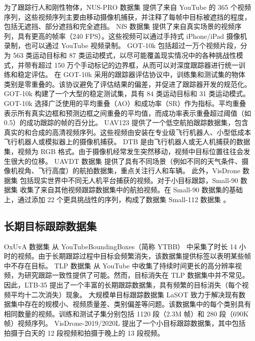 为了跟踪行人和刚性物体，NUS-PRO 数据集 \cite{NUS} 提供了来自 YouTube 的 365 个视频序列，这些视频序列主要由移动摄像机捕获，并注释了每帧中目标被遮挡的程度，包括无遮挡、部分遮挡和完全遮挡。
NfS 数据集 \cite{Nfs} 提供了来自真实场景的视频序列，具有更高的帧率（240 FPS）。这些视频可以通过手持式 iPhone/iPad 摄像机录制，也可以通过 YouTube 视频录制。
GOT-10k \cite{GOT-10k} 包括超过一万个视频片段，分为 563 类运动目标和 87 类运动模式，以尽可能覆盖现实情况中的各种挑战性模式，并带有超过 150 万个手动标记的边界框，从而可以对深度跟踪器进行统一训练和稳定评估。
在 GOT-10k 采用的跟踪器评估协议中，训练集和测试集的物体类别是零重叠的。该协议避免了评估结果的偏差，并促进了跟踪器开发的规范化。
GOT-10k 构建了一个大型的稳定测试集，具有 84 类运动目标和 31 类运动模式。GOT-10k 选择广泛使用的平均重叠（AO）和成功率（SR）作为指标。平均重叠表示所有真实边框和预测边框之间重叠的平均值，而成功率表示重叠超过阈值（如0.5）的成功跟踪的帧的百分比。
UAV123 \cite{mueller2016benchmark} 提供了一个低空航拍跟踪数据集，包含真实的和合成的高清视频序列。这些视频由安装在专业级飞行机器人、小型低成本飞行机器人或模拟器上的摄像机捕获。
DTB \cite{DTB} 是由飞行机器人或无人机捕获的数据集，视频为 RGB 格式。由于摄像机经常发生突然移动，视频中目标位置往往会发生很大的位移。
UAVDT 数据集 \cite{UAVDT} 提供了具有不同场景（例如不同的天气条件、摄像机视角、飞行高度）的航拍数据集，重点关注行人和车辆。
此外，VisDrone 数据集 \cite{VisDrone} 包括现实世界中不同无人机平台捕获的视频。对于小目标跟踪，Small-90 数据集 \cite{Small} 收集了来自其他视频跟踪数据集中的航拍视频。在 Small-90 数据集的基础上，通过添加 22 个更具挑战性的序列，构成了数据集 Small-112 数据集 \cite{Small}。 
\subsection{长期目标跟踪数据集}
OxUvA 数据集 \cite{OxUvA} 从 YouTubeBoundingBoxes（简称 YTBB）\cite{YTBB} 中采集了时长 14 小时的视频。由于长期跟踪过程中目标会频繁消失，该数据集提供标签以表明某些帧中不存在目标。
TLP 数据集 \cite{TLP} 从 YouTube 中收集了持续时间更长的高分辨率视频，为研究跟踪一致性提供了可能。然而，目标消失在 TLP 数据集中并不常见。
因此，LTB-35 \cite{LTB} 提出了一个丰富的长期跟踪数据集，具有频繁的目标消失（每个视频平均十二次消失）现象。
大规模单目标跟踪数据集 LaSOT \cite{LaSOT} 致力于解决现有数据集中存在的规模小、视频质量差、类别偏差等问题。该数据集中的每个类别具有相同数量的视频。训练和测试子集分别包括 1120 段（2.3M 帧）和 280 段（690K 帧）视频序列。
VisDrone-2019/2020L \cite{VisDrone} 提出了一个小目标跟踪数据集，其中包括拍摄于白天的 12 段视频和拍摄于晚上的 13 段视频。%

